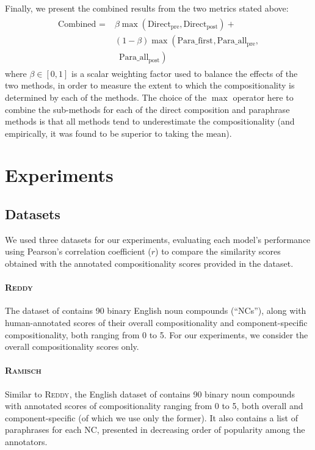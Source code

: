 \documentclass[11pt,a4paper]{article}
\newcommand{\dataset}[2][]{\textsc{#2}$_{\text{#1}}$\xspace}
\newcommand{\reddy}{\dataset{Reddy}}
\newcommand{\ramisch}{\dataset{Ramisch}}
\newcommand{\method}[2][]{\ensuremath{\text{#2}_{\text{#1}}}\xspace}
\newcommand{\presum}{\method[pre]{Direct}}
\newcommand{\postsum}{\method[post]{Direct}}
\newcommand{\firstpara}{\method{Para\_first}}
\newcommand{\avgparapre}{\method[pre]{Para\_all}}
\newcommand{\avgparapost}{\method[post]{Para\_all}}
\newcommand{\combined}{\method{Combined}}
\begin{document}
Finally, we present the combined results from the two metrics stated above:
\begin{eqnarray*}
  \begin{split}
    \combined = & \beta\max\left(\presum, \postsum\right) + \\
    & (1 - \beta)\max\left(\firstpara, \avgparapre, \right.\\
    & \,\,\,\left.\avgparapost\right)
  \end{split}
\end{eqnarray*}
where $\beta\in[0,1]$ is a scalar weighting factor used to balance the effects of the two methods, in order to measure the extent to which the compositionality is determined by each of the methods. The choice of the $\max$ operator here to combine the sub-methods for each of the direct composition and paraphrase methods is that all methods tend to underestimate the compositionality (and empirically, it was found to be superior to taking the mean).

\section{Experiments}
\subsection{Datasets}
\label{sec:datasets}
We used three datasets for our experiments, evaluating each model's performance using Pearson's correlation coefficient ($r$) to compare the similarity scores obtained with the annotated compositionality scores provided in the dataset.
\paragraph{\reddy}
The dataset of  contains 90 binary English noun compounds (``NCs''), along with human-annotated scores of their overall compositionality and component-specific compositionality, both ranging from 0 to 5. For our experiments, we consider the overall compositionality scores only.

\paragraph{\ramisch}
Similar to \reddy, the English dataset of \citet{Ramisch2016} contains 90 binary noun compounds with annotated scores of compositionality ranging from 0 to 5, both overall and component-specific (of which we use only the former). It also contains a list of paraphrases for each NC, presented in decreasing order of popularity among the annotators.
\end{document}
